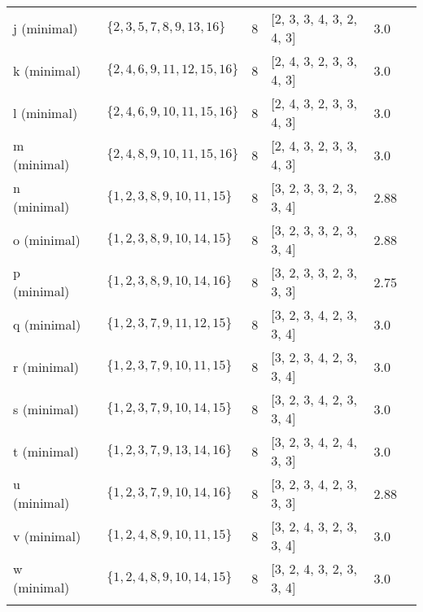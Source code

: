 \documentclass{article}%
\begin{document}
\begin{table}[ht]
\begin{tabularx}{\textwidth}{lXXXXXX}
			j (minimal) & {\Huge\textcolor{green61}{\textbullet}} & $\{2,3,5,7,8,9,13,16\}$ & 8 & [2, 3, 3, 4, 3, 2, 4, 3] & 3.0 \\
			k (minimal) & {\Huge\textcolor{green62}{\textbullet}} & $\{2,4,6,9,11,12,15,16\}$ & 8 & [2, 4, 3, 2, 3, 3, 4, 3] & 3.0 \\
			l (minimal) & {\Huge\textcolor{green63}{\textbullet}} & $\{2,4,6,9,10,11,15,16\}$ & 8 & [2, 4, 3, 2, 3, 3, 4, 3] & 3.0 \\
			m (minimal) & {\Huge\textcolor{green64}{\textbullet}} & $\{2,4,8,9,10,11,15,16\}$ & 8 & [2, 4, 3, 2, 3, 3, 4, 3] & 3.0 \\
			n (minimal) & {\Huge\textcolor{green65}{\textbullet}} & $\{1,2,3,8,9,10,11,15\}$ & 8 & [3, 2, 3, 3, 2, 3, 3, 4] & 2.88 \\
			o (minimal) & {\Huge\textcolor{green66}{\textbullet}} & $\{1,2,3,8,9,10,14,15\}$ & 8 & [3, 2, 3, 3, 2, 3, 3, 4] & 2.88 \\
			p (minimal) & {\Huge\textcolor{green67}{\textbullet}} & $\{1,2,3,8,9,10,14,16\}$ & 8 & [3, 2, 3, 3, 2, 3, 3, 3] & 2.75 \\
			q (minimal) & {\Huge\textcolor{green68}{\textbullet}} & $\{1,2,3,7,9,11,12,15\}$ & 8 & [3, 2, 3, 4, 2, 3, 3, 4] & 3.0 \\
			r (minimal) & {\Huge\textcolor{green69}{\textbullet}} & $\{1,2,3,7,9,10,11,15\}$ & 8 & [3, 2, 3, 4, 2, 3, 3, 4] & 3.0 \\
			s (minimal) & {\Huge\textcolor{green70}{\textbullet}} & $\{1,2,3,7,9,10,14,15\}$ & 8 & [3, 2, 3, 4, 2, 3, 3, 4] & 3.0 \\
			t (minimal) & {\Huge\textcolor{green71}{\textbullet}} & $\{1,2,3,7,9,13,14,16\}$ & 8 & [3, 2, 3, 4, 2, 4, 3, 3] & 3.0 \\
			u (minimal) & {\Huge\textcolor{green72}{\textbullet}} & $\{1,2,3,7,9,10,14,16\}$ & 8 & [3, 2, 3, 4, 2, 3, 3, 3] & 2.88 \\
			v (minimal) & {\Huge\textcolor{green73}{\textbullet}} & $\{1,2,4,8,9,10,11,15\}$ & 8 & [3, 2, 4, 3, 2, 3, 3, 4] & 3.0 \\
			w (minimal) & {\Huge\textcolor{green74}{\textbullet}} & $\{1,2,4,8,9,10,14,15\}$ & 8 & [3, 2, 4, 3, 2, 3, 3, 4] & 3.0 \\
		\bottomrule \\ 
	\end{tabularx}
\end{table}

\newpage
\end{document}
